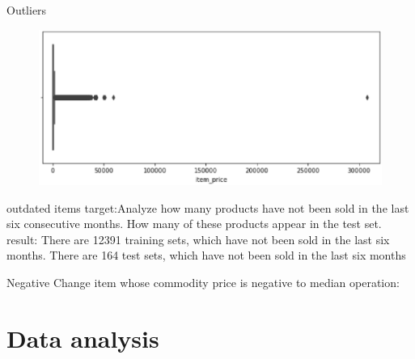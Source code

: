 \documentclass[
 size=14pt,
 paper=smartboard,  %
 mode=present, 		%
 display=slides, 	%
 style=tuliplab,  	%
 pauseslide,
 fleqn,leqno]{powerdot}
\begin{document}
\begin{slide}[toc=,bm=]{Outliers}
  \begin{figure}
    \includegraphics[scale=0.5]{picture/data_8.eps}
  \end{figure}
\end{slide}

\begin{slide}[toc=,bm=]{outdated items}
  target:Analyze how many products have not been sold in the last six consecutive months. How many of these products appear in the test set.
  result:
  There are 12391 training sets, which have not been sold in the last six months.
  There are 164 test sets, which have not been sold in the last six months
\end{slide}

\begin{slide}[toc=,bm=]{Negative}
  Change item whose commodity price is negative to median
  operation:
\end{slide}


\section{Data analysis}
\end{document}
